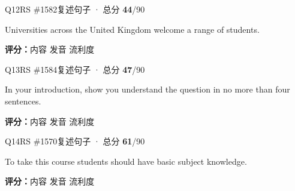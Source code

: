 \begin{qblock}{Q12\quad RS \#1582}{复述句子 · 总分 \textcolor{cAccent}{\bfseries 44}/90}
\begin{promptbox}
Universities across the United Kingdom welcome a range of students.
\end{promptbox}
\asrlegend
\begin{asrbox}
         
\end{asrbox}
\smallskip
{\small\textbf{评分：}内容  \quad\textperiodcentered\quad 发音  \quad\textperiodcentered\quad 流利度 }
\end{qblock}

\begin{qblock}{Q13\quad RS \#1584}{复述句子 · 总分 \textcolor{cAccent}{\bfseries 47}/90}
\begin{promptbox}
In your introduction, show you understand the question in no more than four sentences.
\end{promptbox}
\asrlegend
\begin{asrbox}
             
\end{asrbox}
\smallskip
{\small\textbf{评分：}内容  \quad\textperiodcentered\quad 发音  \quad\textperiodcentered\quad 流利度 }
\end{qblock}

\begin{qblock}{Q14\quad RS \#1570}{复述句子 · 总分 \textcolor{cAccent}{\bfseries 61}/90}
\begin{promptbox}
To take this course students should have basic subject knowledge.
\end{promptbox}
\asrlegend
\begin{asrbox}
         
\end{asrbox}
\smallskip
{\small\textbf{评分：}内容  \quad\textperiodcentered\quad 发音  \quad\textperiodcentered\quad 流利度 }
\end{qblock}

